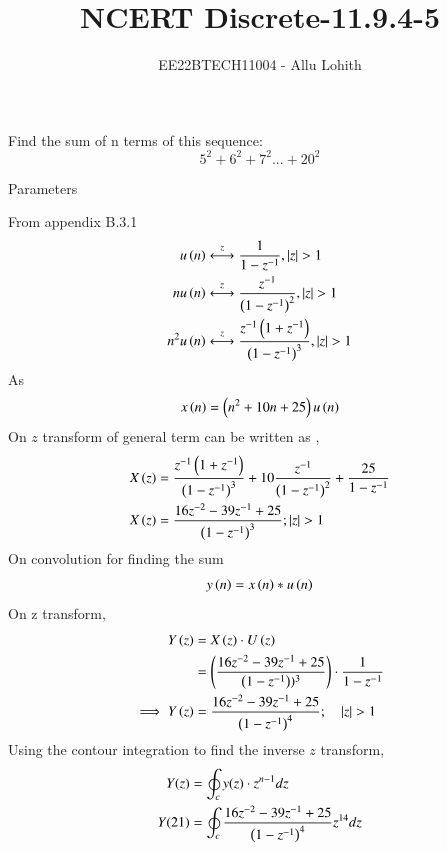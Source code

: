 \documentclass[journal,12pt,twocolumn]{IEEEtran}
\theoremstyle{remark}
\begin{document}

\vspace{3cm}

\title{NCERT Discrete-11.9.4-5}
\author{EE22BTECH11004 - Allu Lohith}

\maketitle
\newpage
\bigskip


 Find the sum of n terms of this sequence:$$5^2+6^2+7^2...+20^2$$  
\solution
\begin{table}[h!]
\centering

\vspace{0.5cm}
\caption{\normalsize Parameters}
\end{table}

From appendix B.3.1
\begin{align}
    u \left(n\right) &\stackrel{z}{\longleftrightarrow} \frac{1}{1-z^{-1}}, \left\vert z\right\vert >1\\
   n u\left(n\right) &\stackrel{z}{\longleftrightarrow} \frac{z^{-1}}{\left(1-z^{-1}\right)^2}, \left\vert z\right\vert >1\\
   n^2 u\left(n\right) &\stackrel{z}{\longleftrightarrow} \frac{z^{-1}\left(1+z^{-1}\right)}{\left(1-z^{-1}\right)^3}, \left\vert z\right\vert >1
\end{align}
As 
\begin{align}
    x\left(n\right) = \left(n^2+10n+25\right)u\left(n\right)
\end{align}
On $z$ transform of general term can be written as , 
\begin{align}
    X\left(z\right) &= \frac{z^{-1}\left(1+z^{-1}\right)}{\left(1-z^{-1}\right)^3}+10\frac{z^{-1}}{\left(1-z^{-1}\right)^2}+\frac{25}{1-z^{-1}} \\
    X\left(z\right) &=  \frac{16z^{-2}-39z^{-1}+25}{\left(1-z^{-1}\right)^3}; \left\vert z\right\vert>1
\end{align}
On convolution for finding the sum
\begin{align}
    y\left(n\right)= x\left(n\right) \ast u\left(n\right)
\end{align}
On z transform,
\begin{align}
    Y\left(z\right) &= X \left(z\right) \cdot U \left(z\right)\\
    &= \left(\frac{16z^{-2}-39z^{-1}+25}{\left(1-z^{-1}\right))^3}\right) \cdot \frac{1}{1-z^{-1}}\\
    \implies 
    Y \left(z\right) & = \frac{16z^{-2}-39z^{-1}+25}{\left(1-z^{-1}\right)^4}; \quad \left\vert z\right\vert >1
\end{align}
Using the contour integration to find the inverse $z$ transform,
\begin{align}
    Y(z)&=\oint_c y(z)\cdot z^{n-1}dz\\
    Y(21)&=\oint_c \frac{16z^{-2}-39z^{-1}+25}{\left(1-z^{-1}\right)^4} z^{14}dz
\end{align}
\end{document}
